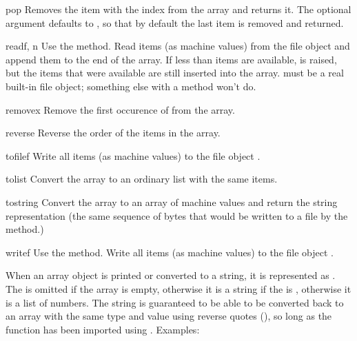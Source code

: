 \begin{methoddesc}[array]{pop}{}
Removes the item with the index  from the array and returns
it. The optional argument defaults to , so that by default
the last item is removed and returned. 
\end{methoddesc}

\begin{methoddesc}[array]{read}{f, n}
  {Use the  method.}
Read  items (as machine values) from the file object 
and append them to the end of the array.  If less than  items
are available,  is raised, but the items that were
available are still inserted into the array.   must be a real
built-in file object; something else with a  method won't
do.
\end{methoddesc}

\begin{methoddesc}[array]{remove}{x}
Remove the first occurence of  from the array.
\end{methoddesc}

\begin{methoddesc}[array]{reverse}{}
Reverse the order of the items in the array.
\end{methoddesc}

\begin{methoddesc}[array]{tofile}{f}
Write all items (as machine values) to the file object .
\end{methoddesc}

\begin{methoddesc}[array]{tolist}{}
Convert the array to an ordinary list with the same items.
\end{methoddesc}

\begin{methoddesc}[array]{tostring}{}
Convert the array to an array of machine values and return the
string representation (the same sequence of bytes that would
be written to a file by the  method.)
\end{methoddesc}

\begin{methoddesc}[array]{write}{f}
  {Use the  method.}
Write all items (as machine values) to the file object .
\end{methoddesc}

When an array object is printed or converted to a string, it is
represented as .  The
 is omitted if the array is empty, otherwise it is a
string if the  is , otherwise it is a list of
numbers.  The string is guaranteed to be able to be converted back to
an array with the same type and value using reverse quotes
(), so long as the  function has been
imported using .  Examples:

